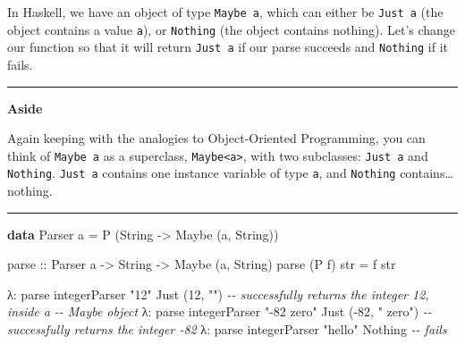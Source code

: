 \documentclass[]{article}
\newenvironment{Shaded}{}{}
\newcommand{\CommentTok}[1]{\textcolor[rgb]{0.38,0.63,0.69}{\textit{#1}}}
\newcommand{\DataTypeTok}[1]{\textcolor[rgb]{0.56,0.13,0.00}{#1}}
\newcommand{\DecValTok}[1]{\textcolor[rgb]{0.25,0.63,0.44}{#1}}
\newcommand{\KeywordTok}[1]{\textcolor[rgb]{0.00,0.44,0.13}{\textbf{#1}}}
\newcommand{\NormalTok}[1]{#1}
\newcommand{\OperatorTok}[1]{\textcolor[rgb]{0.40,0.40,0.40}{#1}}
\newcommand{\OtherTok}[1]{\textcolor[rgb]{0.00,0.44,0.13}{#1}}
\newcommand{\StringTok}[1]{\textcolor[rgb]{0.25,0.44,0.63}{#1}}
\begin{document}
In Haskell, we have an object of type \texttt{Maybe\ a}, which can either be
\texttt{Just\ a} (the object contains a value \texttt{a}), or \texttt{Nothing}
(the object contains nothing). Let's change our function so that it will return
\texttt{Just\ a} if our parse succeeds and \texttt{Nothing} if it fails.

\begin{center}\rule{0.5\linewidth}{0.5pt}\end{center}

\textbf{Aside}

Again keeping with the analogies to Object-Oriented Programming, you can think
of \texttt{Maybe\ a} as a superclass, \texttt{Maybe\textless{}a\textgreater{}},
with two subclasses: \texttt{Just\ a} and \texttt{Nothing}. \texttt{Just\ a}
contains one instance variable of type \texttt{a}, and \texttt{Nothing}
contains\ldots nothing.

\begin{center}\rule{0.5\linewidth}{0.5pt}\end{center}

\begin{Shaded}
\begin{Highlighting}[]
\KeywordTok{data} \DataTypeTok{Parser}\NormalTok{ a }\OtherTok{=} \DataTypeTok{P}\NormalTok{ (}\DataTypeTok{String} \OtherTok{{-}\textgreater{}} \DataTypeTok{Maybe}\NormalTok{ (a, }\DataTypeTok{String}\NormalTok{))}

\OtherTok{parse ::} \DataTypeTok{Parser}\NormalTok{ a }\OtherTok{{-}\textgreater{}} \DataTypeTok{String} \OtherTok{{-}\textgreater{}} \DataTypeTok{Maybe}\NormalTok{ (a, }\DataTypeTok{String}\NormalTok{)}
\NormalTok{parse (}\DataTypeTok{P}\NormalTok{ f) str }\OtherTok{=}\NormalTok{ f str}
\end{Highlighting}
\end{Shaded}

\begin{Shaded}
\begin{Highlighting}[]
\NormalTok{λ}\OperatorTok{:}\NormalTok{ parse integerParser }\StringTok{"12"}
\DataTypeTok{Just}\NormalTok{ (}\DecValTok{12}\NormalTok{, }\StringTok{""}\NormalTok{)               }\CommentTok{{-}{-} successfully returns the integer 12, inside a}
                            \CommentTok{{-}{-} Maybe object}
\NormalTok{λ}\OperatorTok{:}\NormalTok{ parse integerParser }\StringTok{"{-}82 zero"}
\DataTypeTok{Just}\NormalTok{ (}\OperatorTok{{-}}\DecValTok{82}\NormalTok{, }\StringTok{" zero"}\NormalTok{)         }\CommentTok{{-}{-} successfully returns the integer {-}82}
\NormalTok{λ}\OperatorTok{:}\NormalTok{ parse integerParser }\StringTok{"hello"}
\DataTypeTok{Nothing}                     \CommentTok{{-}{-} fails}
\end{Highlighting}
\end{Shaded}
\end{document}
